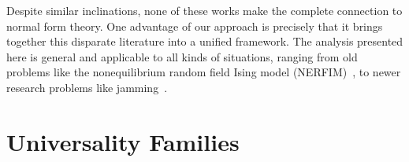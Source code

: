 \documentclass[
 reprint,
 amsmath,amssymb,
 aps, superscriptaddress, pre
]{revtex4-1}
\begin{document}
Despite similar inclinations, none of these works make the complete
connection to normal form theory. One advantage of our approach is precisely that it brings together this disparate literature into a unified framework.  The
analysis presented here is general and applicable to all kinds of
situations, ranging from old problems like the nonequilibrium random field Ising
model (NERFIM)~\cite{PerkovicDS95}, to newer research problems like jamming~\cite{goodrich2014jamming}. 


\section{Universality Families} \label{sec:universality}

\begin{table*}
\begin{center}
\end{center}
\end{table*}
\end{document}
